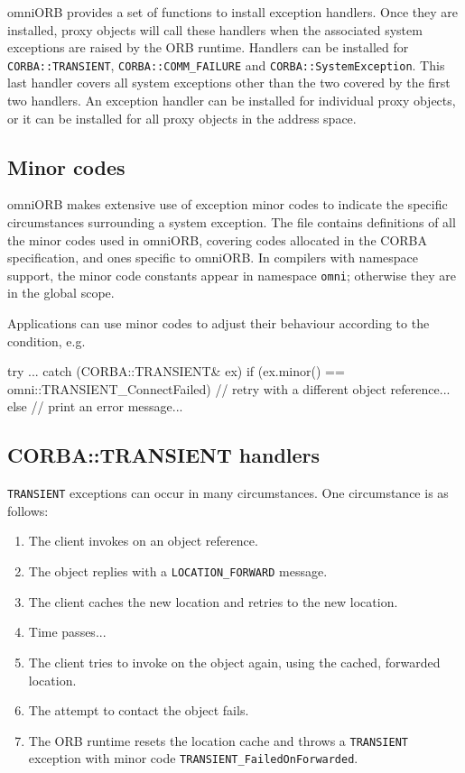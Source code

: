 \documentclass[11pt,twoside,a4paper]{book}
\newcommand{\code}[1]{\texttt{#1}}
\newcommand{\file}{\begingroup \urlstyle{tt}\Url}
\newcommand{\dsc}{\discretionary{}{}{}}
\begin{document}
omniORB provides a set of functions to install exception handlers.
Once they are installed, proxy objects will call these handlers when
the associated system exceptions are raised by the ORB runtime.
Handlers can be installed for \code{CORBA::\dsc{}TRANSIENT},
\code{CORBA::COMM\_FAILURE} and \code{CORBA::SystemException}.  This
last handler covers all system exceptions other than the two covered
by the first two handlers. An exception handler can be installed for
individual proxy objects, or it can be installed for all proxy objects
in the address space.


\subsection{Minor codes}

omniORB makes extensive use of exception minor codes to indicate the
specific circumstances surrounding a system exception.  The file
\file{include/omniORB4/minorCode.h} contains definitions of all the
minor codes used in omniORB, covering codes allocated in the CORBA
specification, and ones specific to omniORB. In compilers with
namespace support, the minor code constants appear in namespace
\code{omni}; otherwise they are in the global scope.

Applications can use minor codes to adjust their behaviour according
to the condition, e.g.

\begin{cxxlisting}
try {
  ...
}
catch (CORBA::TRANSIENT& ex) {
  if (ex.minor() == omni::TRANSIENT_ConnectFailed) {
    // retry with a different object reference...
  }
  else {
    // print an error message...
  }
}
\end{cxxlisting}



\subsection{CORBA::TRANSIENT handlers}

\code{TRANSIENT} exceptions can occur in many circumstances. One
circumstance is as follows:

\begin{enumerate}

\item The client invokes on an object reference.
\item The object replies with a \code{LOCATION\_FORWARD} message.
\item The client caches the new location and retries to the new location.
\item Time passes...
\item The client tries to invoke on the object again, using the
      cached, forwarded location. 
\item The attempt to contact the object fails.
\item The ORB runtime resets the location cache and throws a
      \code{TRANSIENT} exception with minor code
      \code{TRANSIENT\_FailedOnForwarded}.

\end{enumerate}
\end{document}
